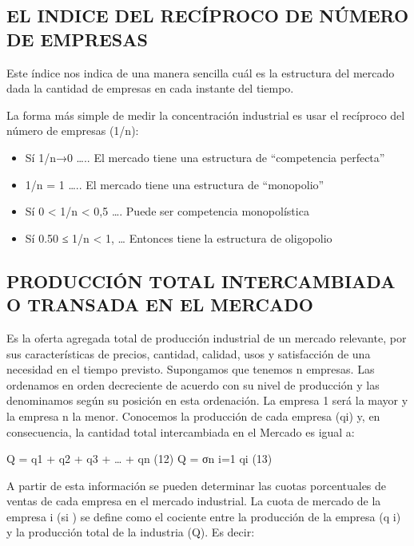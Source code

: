 \documentclass[
  letterpaper,
  DIV=11,
  numbers=noendperiod]{scrartcl}
\begin{document}
\hypertarget{el-indice-del-recuxedproco-de-nuxfamero-de-empresas}{%
\subsection{EL INDICE DEL RECÍPROCO DE NÚMERO DE
EMPRESAS}\label{el-indice-del-recuxedproco-de-nuxfamero-de-empresas}}

Este índice nos indica de una manera sencilla cuál es la estructura del
mercado dada la cantidad de empresas en cada instante del tiempo.

La forma más simple de medir la concentración industrial es usar el
recíproco del número de empresas (1/n):

\begin{itemize}
\item
  Sí 1/n→0 \ldots.. El mercado tiene una estructura de ``competencia
  perfecta''
\item
  1/n = 1 \ldots.. El mercado tiene una estructura de ``monopolio''
\item
  Sí 0 \textless{} 1/n \textless{} 0,5 \ldots. Puede ser competencia
  monopolística
\item
  Sí 0.50 ≤ 1/n \textless{} 1, \ldots{} Entonces tiene la estructura de
  oligopolio
\end{itemize}

\hypertarget{producciuxf3n-total-intercambiada-o-transada-en-el-mercado}{%
\subsection{PRODUCCIÓN TOTAL INTERCAMBIADA O TRANSADA EN EL
MERCADO}\label{producciuxf3n-total-intercambiada-o-transada-en-el-mercado}}

Es la oferta agregada total de producción industrial de un mercado
relevante, por sus características de precios, cantidad, calidad, usos y
satisfacción de una necesidad en el tiempo previsto. Supongamos que
tenemos n empresas. Las ordenamos en orden decreciente de acuerdo con su
nivel de producción y las denominamos según su posición en esta
ordenación. La empresa 1 será la mayor y la empresa n la menor.
Conocemos la producción de cada empresa (qi) y, en consecuencia, la
cantidad total intercambiada en el Mercado es igual a:

Q = q1 + q2 + q3 + \ldots{} + qn (12) Q = σn i=1 qi (13)

A partir de esta información se pueden determinar las cuotas
porcentuales de ventas de cada empresa en el mercado industrial. La
cuota de mercado de la empresa i (si ) se define como el cociente entre
la producción de la empresa (q i) y la producción total de la industria
(Q). Es decir:
\end{document}
